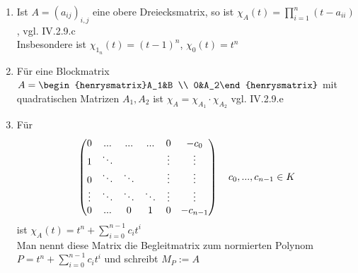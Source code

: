 \begin{example}
	\begin{enumerate}
		\item Ist $A=(a_{ij})_{i,j}$ eine obere Dreiecksmatrix, so ist $\chi_A(t)=\prod_{i=1}^n (t-a_{ii})$, vgl. IV.2.9.c \\ %
		Insbesondere ist $\chi_{1_n}(t)=(t-1)^n$, $\chi_0(t)=t^n$
		\item Für eine Blockmatrix $A=\begin{henrysmatrix}A_1&B \\ 0&A_2\end{henrysmatrix}$ mit quadratischen Matrizen $A_1,A_2$ ist $\chi_A=\chi_{A_1}\cdot \chi_{A_2}$ vgl. IV.2.9.e %
		\item Für
		\begin{align}
			\begin{pmatrix}
			0&...&...&...&0&-c_0  \\ 
			1& \ddots&\;&\;&\vdots&\vdots  \\ 
			0&\ddots&\ddots&\;&\vdots&\vdots  \\ 
			\vdots&\ddots&\ddots&\ddots&\vdots&\vdots  \\ 
			0&...&0&1&0&-c_{n-1} 
			\end{pmatrix} \quad c_0,...,c_{n-1}\in K \notag
		\end{align}
		ist $\chi_A(t)=t^n+\sum_{i=0}^{n-1} c_i t^i$ \\
		Man nennt diese Matrix die Begleitmatrix zum normierten Polynom $P=t^n+\sum_{i=0}^{n-1} c_i t^i$ und schreibt $M_P:=A$
	\end{enumerate}
\end{example}